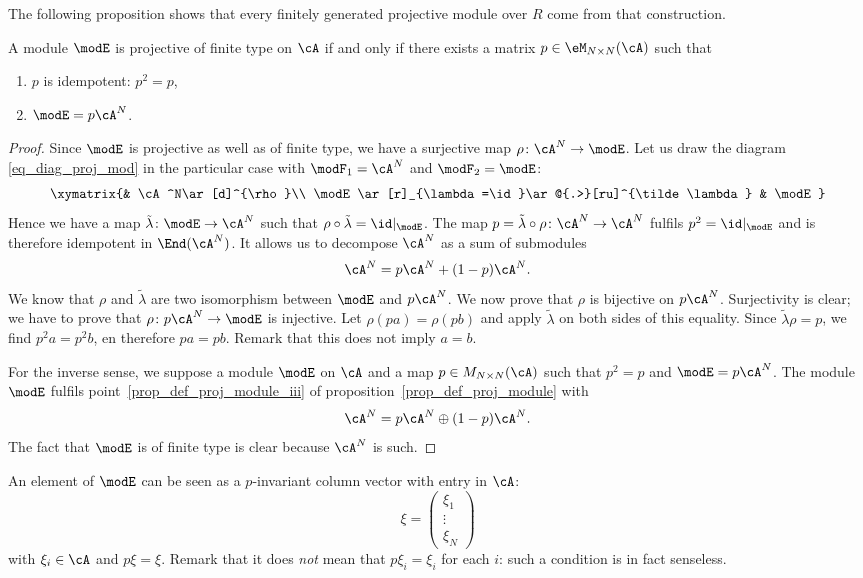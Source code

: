 The following proposition shows that every finitely generated projective module over $R$ come from that construction.
\begin{proposition}
	A module $\modE$ is projective of finite type on $\cA$ if and only if there exists a matrix $p\in \eM_{N\times N}(\cA)$ such that
	\begin{enumerate}
		\item $p$ is idempotent: $p^2=p$,
		\item $\modE=p\cA^N$.
	\end{enumerate}

\end{proposition}

\begin{proof}

	Since $\modE$ is projective as well as of finite type, we have a surjective map $\rho\colon \cA^N\to \modE$. Let us draw the diagram \eqref{eq_diag_proj_mod} in the particular case with $\modF_1=\cA^N$ and $\modF_2=\modE$:
	\begin{equation}
		\xymatrix{%
			&	\cA^N\ar[d]^{\rho}\\
			\modE \ar[r]_{\lambda=\id}\ar@{.>}[ru]^{\tilde\lambda}	&	\modE
		}
	\end{equation}
	Hence we have a map $\tilde\lambda\colon \modE\to \cA^N$ such that $\rho\circ\tilde\lambda=\id|_{\modE}$. The map $p=\tilde\lambda\circ\rho\colon \cA^N\to \cA^N$ fulfils $p^2=\id|_{\modE}$ and is therefore idempotent in $\End(\cA^N)$. It allows us to decompose $\cA^N$ as a sum of submodules
	\[
		\cA^N=p\cA^N+(1-p)\cA^N.
	\]
	We know that $\rho$ and $\tilde\lambda$ are two isomorphism between $\modE$ and $p\cA^N$. We now prove that $\rho$ is bijective on $p\cA^N$. Surjectivity is clear; we have to prove that $\rho\colon p\cA^N\to \modE$ is injective. Let $\rho(pa)=\rho(pb)$ and apply $\tilde\lambda$ on both sides of this equality. Since $\tilde\lambda\rho=p$, we find $p^2a=p^2b$, en therefore $pa=pb$. Remark that this does not imply $a=b$.

	For the inverse sense, we suppose a module $\modE$ on $\cA$ and a map $p\in M_{N\times N}(\cA)$ such that $p^2=p$ and $\modE=p\cA^N$. The module $\modE$ fulfils point~\ref{prop_def_proj_module_iii} of proposition~\ref{prop_def_proj_module} with
	\[
		\cA^N=p\cA^N\oplus(1-p)\cA^N.
	\]
	The fact that $\modE$ is of finite type is clear because $\cA^N$ is such.

\end{proof}
An element of $\modE$ can be seen as a $p$-invariant column vector with entry in $\cA$:
\[
	\xi=
	\begin{pmatrix}
		\xi_1 \\\vdots\\\xi_N
	\end{pmatrix}
\]
with $\xi_i\in\cA$ and $p\xi=\xi$. Remark that it does \emph{not} mean that $p\xi_i=\xi_i$ for each $i$: such a condition is in fact senseless.

